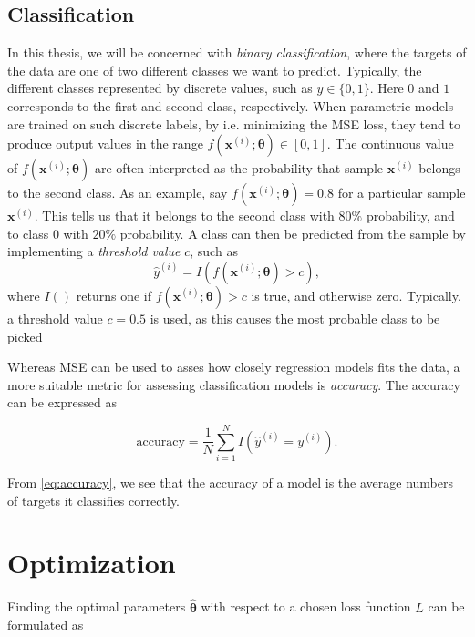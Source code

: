 \subsection{Classification}\label{sec:Classifcation}
In this thesis, we will be concerned with \emph{binary classification}, where the targets of the data are one of two different classes we want to predict. Typically, the different classes represented by discrete values, such as $y \in \{0,1\}$. Here $0$ and $1$ corresponds to the first and second class, respectively. When parametric models are trained on such discrete labels, by i.e.  minimizing the MSE loss, they tend to produce output values in the range $f(\boldsymbol{x}^{(i)}; \boldsymbol{\theta}) \in [0,1]$. The continuous value of $f(\boldsymbol{x}^{(i)}; \boldsymbol{\theta})$ are often interpreted as the probability that sample $\boldsymbol{x}^{(i)}$ belongs to the second class. As an example, say $f(\boldsymbol{x}^{(i)}; \boldsymbol{\theta}) = 0.8$ for a particular sample $\boldsymbol{x}^{(i)}$. This tells us that it belongs to the second class with $80\%$ probability, and to class $0$ with $20\%$ probability. A class can then be predicted from the  sample by implementing a \emph{threshold value} $c$, such as
\begin{equation}
    \hat{y}^{(i)} = I(f(\boldsymbol{x}^{(i)}; \boldsymbol{\theta}) > c),
\end{equation}
where $I()$ returns one if $f(\boldsymbol{x}^{(i)}; \boldsymbol{\theta}) > c$ is true, and otherwise zero. Typically, a threshold value $c = 0.5$ is used, as this causes the most probable class to be picked  

Whereas MSE can be used to asses how closely regression models fits the data, a more suitable metric for assessing classification models is \emph{accuracy}. The accuracy can be expressed as 

\begin{equation}\label{eq:accuracy}
    \text{accuracy} = \frac{1}{N}\sum_{i=1}^{N} I(\hat{y}^{(i)} = y^{(i)}).
\end{equation}

From \autoref{eq:accuracy}, we see that the accuracy of a model is the average numbers of targets it classifies correctly.  


\section{Optimization}\label{sec:Optimization}
Finding the optimal parameters $\hat{\boldsymbol{\theta}}$ with respect to a chosen loss function $L$ can be formulated as

